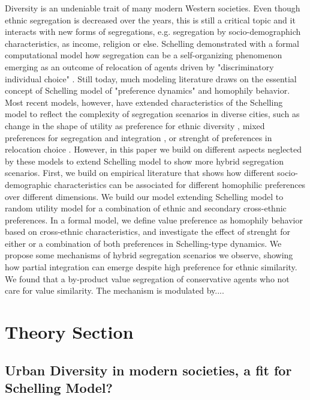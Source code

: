 \documentclass[
]{article}
\begin{document}
Diversity is an undeniable trait of many modern Western societies. Even though ethnic segregation is decreased over the years, this is still a critical topic and it interacts with new forms of segregations, e.g. segregation by socio-demographich characteristics, as income, religion or else. Schelling \cite{schelling1969models,schelling1971dynamic} demonstrated with a formal computational model how segregation can be a self-organizing phenomenon emerging as an outcome of relocation of agents driven by "discriminatory individual choice" \citep[p. 488]{schelling1969models}. Still today, much modeling literature draws on the essential concept of Schelling model of "preference dynamics" \citep{clark2008understanding} and homophily behavior. Most recent models, however, have extended characteristics of the Schelling model  to reflect the complexity of segregation scenarios in diverse cities, such as change in the shape of utility as preference for ethnic diversity \cite{zhang2004,zhang2011}, mixed preferences for segregation and integration \cite{hatna2012schelling}, or strenght of preferences in relocation choice \cite{bruch2006neighborhood,bruch2009preferences}. However, in this paper we build on different aspects neglected by these models to extend Schelling model to show more hybrid segregation scenarios. First, we build on empirical literature that shows how different socio-demographic characteristics can be associated for different homophilic preferences over different dimensions. We build our model extending Schelling model to random utility model for a combination of ethnic and secondary cross-ethnic preferences. In a formal model, we define value preference as homophily behavior based on cross-ethnic characteristics, and investigate the effect of strenght for either or a combination of both preferences in Schelling-type dynamics.
We propose some mechanisms of hybrid segregation scenarios we observe, showing how partial integration can emerge despite high preference for ethnic similarity. We found that a by-product value segregation of conservative agents who not care for value similarity. The mechanism is modulated by....

\hypertarget{Theory Section}{%
\section{Theory Section}\label{theorysection}}

\subsection{Urban Diversity in modern societies, a fit for Schelling Model?}
\end{document}
